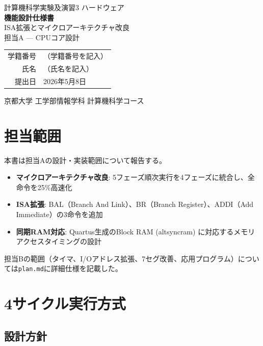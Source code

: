 \documentclass[a4paper,11pt]{ltjsarticle}
\begin{document}
\begin{titlepage}
\centering
\vspace*{3cm}
{\LARGE 計算機科学実験及演習3 ハードウェア}\\[1cm]
{\Huge\bfseries 機能設計仕様書}\\[0.5cm]
{\LARGE ISA拡張とマイクロアーキテクチャ改良}\\[0.5cm]
{\Large 担当A — CPUコア設計}\\[3cm]
\begin{tabular}{rl}
学籍番号 & （学籍番号を記入） \\[0.5em]
氏名     & （氏名を記入） \\[0.5em]
提出日   & 2026年5月8日 \\
\end{tabular}
\vfill
京都大学 工学部情報学科 計算機科学コース
\end{titlepage}

\tableofcontents
\clearpage

\section{担当範囲}

本書は担当Aの設計・実装範囲について報告する。

\begin{itemize}
\item \textbf{マイクロアーキテクチャ改良}: 5フェーズ順次実行を4フェーズに統合し、全命令を25\%高速化
\item \textbf{ISA拡張}: BAL（Branch And Link）、BR（Branch Register）、ADDI（Add Immediate）の3命令を追加
\item \textbf{同期RAM対応}: Quartus生成のBlock RAM (altsyncram) に対応するメモリアクセスタイミングの設計
\end{itemize}

担当Bの範囲（タイマ、I/Oアドレス拡張、7セグ改善、応用プログラム）については\texttt{plan.md}に詳細仕様を記載した。

\section{4サイクル実行方式}

\subsection{設計方針}
\end{document}
